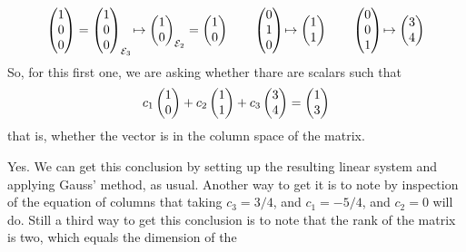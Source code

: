 \begin{exercises}
\begin{answer}
     \begin{equation*}
       \begin{pmatrix} 1 \\ 0 \\ 0 \end{pmatrix}=\begin{pmatrix} 1 \\ 0 \\ 0 \end{pmatrix}_{{\cal E}_3}
          \!\mapsto\begin{pmatrix} 1 \\ 0 \end{pmatrix}_{{\cal E}_2}=\begin{pmatrix} 1 \\ 0 \end{pmatrix}
       \qquad
       \begin{pmatrix} 0 \\ 1 \\ 0 \end{pmatrix}
          \!\mapsto\begin{pmatrix} 1 \\ 1 \end{pmatrix}
       \qquad
       \begin{pmatrix} 0 \\ 0 \\ 1 \end{pmatrix}
          \!\mapsto\begin{pmatrix} 3 \\ 4 \end{pmatrix}
     \end{equation*}
     So, for this first one, we are asking whether thare are scalars such that
     \begin{equation*}
       c_1\begin{pmatrix} 1 \\ 0 \end{pmatrix}+c_2\begin{pmatrix} 1 \\ 1 \end{pmatrix}+c_3\begin{pmatrix} 3 \\ 4 \end{pmatrix}=\begin{pmatrix} 1 \\ 3 \end{pmatrix}
     \end{equation*}
     that is, whether the vector is in the column space of the matrix.
     \begin{exparts}
       \partsitem Yes.
         We can get this conclusion by setting up the resulting linear system
         and applying Gauss' method, as usual.
         Another way to get it is to note by inspection of the equation of
         columns that taking $c_3=3/4$, and $c_1=-5/4$, and $c_2=0$ will do.  
         Still a third way to get this conclusion is to note that the rank
         of the matrix is two, which equals the dimension of the

\end{exparts}
\end{answer}
\end{exercises}
